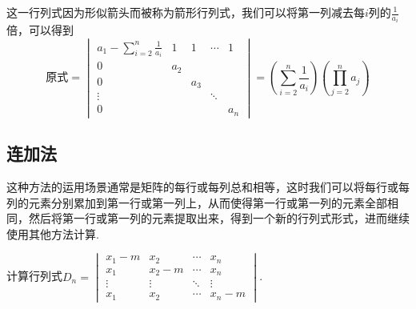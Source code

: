 \begin{solution}
    这一行列式因为形似箭头而被称为箭形行列式，我们可以将第一列减去每$i$列的$\frac{1}{a_i}$倍，可以得到
    \[ \text{原式}=\begin{vmatrix}
            a_1-\displaystyle\sum_{i=2}^n\frac{1}{a_i} & 1   & 1   & \cdots & 1   \\
            0                                          & a_2                      \\
            0                                          &     & a_3                \\
            \vdots                                     &     &     & \ddots       \\
            0                                          &     &     &        & a_n
        \end{vmatrix} = \left(\sum_{i=2}^n\frac{1}{a_i}\right) \left(\prod_{j=2}^na_j\right) \]
\end{solution}

\subsection{连加法}

这种方法的运用场景通常是矩阵的每行或每列总和相等，这时我们可以将每行或每列的元素分别累加到第一行或第一列上，从而使得第一行或第一列的元素全部相同，然后将第一行或第一列的元素提取出来，得到一个新的行列式形式，进而继续使用其他方法计算.

\begin{example}{}{}
    计算行列式$D_n=\begin{vmatrix}
            x_1-m  & x_2    & \cdots & x_n    \\
            x_1    & x_2-m  & \cdots & x_n    \\
            \vdots & \vdots & \ddots & \vdots \\
            x_1    & x_2    & \cdots & x_n-m
        \end{vmatrix}$.
\end{example}

